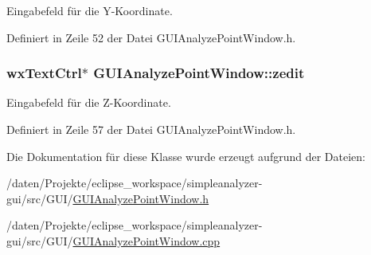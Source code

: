 Eingabefeld für die Y-\/\-Koordinate. 



Definiert in Zeile 52 der Datei G\-U\-I\-Analyze\-Point\-Window.\-h.

\hypertarget{classGUIAnalyzePointWindow_a173e639b35cc6c18a74fb746b8664c8c}{
\subsubsection[{zedit}]{\setlength{\rightskip}{0pt plus 5cm}wx\-Text\-Ctrl$\ast$ G\-U\-I\-Analyze\-Point\-Window\-::zedit\hspace{0.3cm}{\ttfamily [private]}}}\label{classGUIAnalyzePointWindow_a173e639b35cc6c18a74fb746b8664c8c}


Eingabefeld für die Z-\/\-Koordinate. 



Definiert in Zeile 57 der Datei G\-U\-I\-Analyze\-Point\-Window.\-h.



Die Dokumentation für diese Klasse wurde erzeugt aufgrund der Dateien\-:\begin{DoxyCompactItemize}
\item 
/daten/\-Projekte/eclipse\-\_\-workspace/simpleanalyzer-\/gui/src/\-G\-U\-I/\hyperlink{GUIAnalyzePointWindow_8h}{G\-U\-I\-Analyze\-Point\-Window.\-h}\item 
/daten/\-Projekte/eclipse\-\_\-workspace/simpleanalyzer-\/gui/src/\-G\-U\-I/\hyperlink{GUIAnalyzePointWindow_8cpp}{G\-U\-I\-Analyze\-Point\-Window.\-cpp}\end{DoxyCompactItemize}
